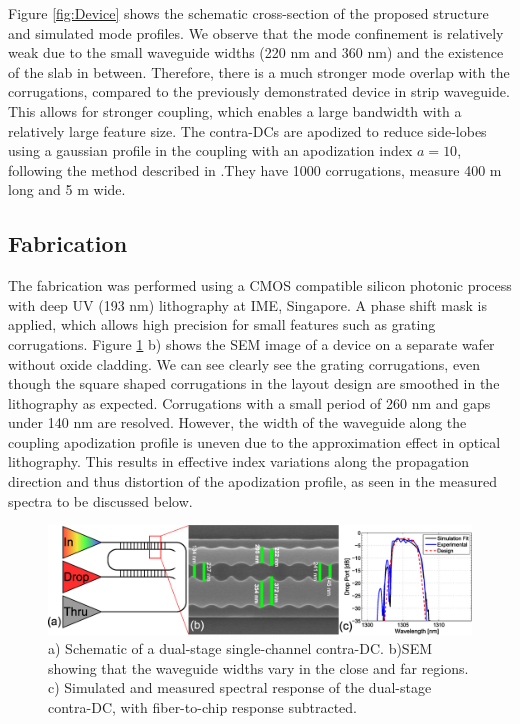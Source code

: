 \documentclass[letterpaper,10pt]{article}
\begin{document}
Figure \ref{fig:Device} shows the schematic cross-section of the proposed structure and simulated mode profiles. We observe that the mode confinement is relatively weak due to the small waveguide widths (220 nm and 360 nm) and the existence of the slab in between. Therefore, there is a much stronger mode overlap with the corrugations, compared to the previously demonstrated device in strip waveguide. This allows for stronger coupling, which enables a large bandwidth with a relatively large feature size. The contra-DCs are apodized to reduce side-lobes using a gaussian profile in the coupling with an apodization index $a=10$, following the method described in \cite{shi2013siliconContraDC}.They have 1000 corrugations, measure 400  \textmu m long and 5  \textmu m wide.

\subsection{Fabrication}
The fabrication was performed using a CMOS compatible silicon photonic process with deep UV (193 nm) lithography at IME, Singapore. A phase shift mask is applied, which allows high precision for small features such as grating corrugations. 
Figure \ref{fig:litho} b) shows the SEM image of a device on a separate wafer without oxide cladding. We can see clearly see the grating corrugations, even though the square shaped corrugations in the layout design are smoothed in the lithography as expected. Corrugations with a small period of 260 nm and gaps under 140 nm are resolved.
However, the width of the waveguide along the coupling apodization profile is uneven due to the approximation effect in optical lithography. This results in effective index variations along the propagation direction and thus distortion of the apodization profile, as seen in the measured spectra to be discussed below.

\begin{figure}[htbp]
	\centering
	\includegraphics[width=.99\columnwidth]{SingleFilterFig}
	\caption{ a) Schematic of a dual-stage single-channel contra-DC. b)SEM showing that the waveguide widths vary in the close and far regions. c) Simulated and measured spectral response of the dual-stage contra-DC, with fiber-to-chip response subtracted.}
	\vspace{-20pt}
    \label{fig:litho}
\end{figure}
\end{document}
